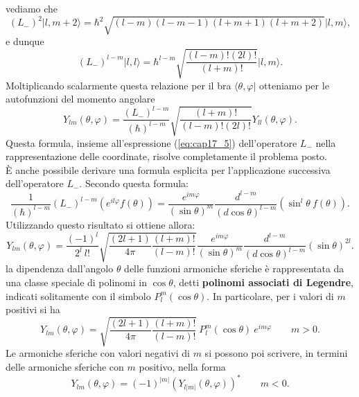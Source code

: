 vediamo che 
\begin{equation}
(L_-)^2 \vert l, m+2 \rangle = \hbar ^2 \sqrt{(l-m)(l-m-1)(l+m+1)(l+m+2)}\vert l,m \rangle ,
\end{equation}
e dunque
\begin{equation}
(L_-)^{l-m} \vert l, l \rangle = \hbar ^{l-m} \sqrt{\frac{(l-m)!(2l)!}{(l+m)!}}\vert l,m \rangle .
\end{equation}
Moltiplicando scalarmente questa relazione per il bra $\langle \theta , \varphi \vert $ otteniamo per le autofunzioni del momento angolare
\begin{equation}
Y_{lm} (\theta ,  \varphi ) = \frac{(L_-)^{l-m}}{(\hbar )^{l-m}}\sqrt{\frac{(l+m)!}{(l-m)!(2l)!}} Y_{ll} (\theta , \varphi) . 
\end{equation}
Questa formula, insieme all'espressione (\ref{eq:cap17_5}) dell'operatore $L_-$ nella rappresentazione delle coordinate, risolve completamente il problema posto.\\
È anche possibile derivare una formula esplicita per l'applicazione successiva dell'operatore $L_-$. Secondo questa formula:
\begin{equation}
\frac{1}{(\hbar) ^{l-m}}(L_-)^{l-m} \left( e^{il\varphi} f(\theta) \right) = \frac{e^{im\varphi}}{(\sin \theta ) ^m} \frac{d^{l-m}}{(d\cos \theta )^{l-m}}\left( \sin ^l \theta \ f(\theta ) \right).
\end{equation}
Utilizzando questo risultato si ottiene allora:
\begin{equation}
Y_{lm} (\theta ,  \varphi ) = \frac{(-1)^{l}}{2^l\ l!}\sqrt{\frac{(2l+1)}{4\pi}\frac{(l+m)!}{(l-m)!}}  \frac{e^{im\varphi}}{(\sin \theta ) ^m} \frac{d^{l-m}}{(d\cos \theta )^{l-m}}\left( \sin  \theta \right) ^{2l}.
\end{equation}
la dipendenza dall'angolo $\theta$ delle funzioni armoniche sferiche è rappresentata da una classe speciale di polinomi in $\cos \theta$, detti \textbf{polinomi associati di Legendre}, indicati solitamente con il simbolo $P_l ^m (\cos \theta)$. In particolare, per i valori di $m$ positivi si ha 
\begin{equation}
Y_{lm} (\theta ,  \varphi ) = \sqrt{\frac{(2l+1)}{4\pi}\frac{(l+m)!}{(l-m)!}}\ P_l ^m (\cos \theta)\ e^{im\varphi}\qquad m>0.
\end{equation}
Le armoniche sferiche con valori negativi di $m$ si possono poi scrivere, in termini delle armoniche sferiche con $m$ positivo, nella forma
\begin{equation}
Y_{lm} (\theta ,  \varphi ) = (-1)^{|m|}\left(Y_{l|m|} (\theta ,  \varphi )\right) ^* \qquad m<0.
\end{equation}
